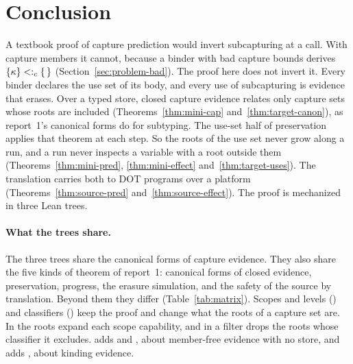 \section{Conclusion}\label{sec:conclusion}
\mathplain
\suppressfloats[t]

A textbook proof of capture prediction would invert subcapturing at a call. With capture members it cannot, because a binder with bad capture bounds derives $\{\kappa\} <:_{c} \{\,\}$ (Section~\ref{sec:problem-bad}). The proof here does not invert it. Every binder declares the use set of its body, and every use of subcapturing is evidence that erases. Over a typed store, closed capture evidence relates only capture sets whose roots are included (Theorems~\ref{thm:mini-cap} and~\ref{thm:target-canon}), as report~1's canonical forms do for subtyping. The use-set half of preservation applies that theorem at each step. So the roots of the use set never grow along a run, and a run never inspects a variable with a root outside them (Theorems~\ref{thm:mini-pred}, \ref{thm:mini-effect} and~\ref{thm:target-uses}). The translation carries both to DOT programs over a platform (Theorems~\ref{thm:source-pred} and~\ref{thm:source-effect}). The proof is mechanized in three Lean trees.

\paragraph{What the trees share.}
The three trees share the canonical forms of capture evidence. They also share the five kinds of theorem of report~1: canonical forms of closed evidence, preservation, progress, the erasure simulation, and the safety of the source by translation. Beyond them they differ (Table~\ref{tab:matrix}). Scopes and levels (\treeCC) and classifiers (\treeCL) keep the proof and change what the roots of a capture set are. In \treeCC the roots expand each scope capability, and in \treeCL a filter drops the roots whose classifier it excludes. \treeCC adds  and , about member-free evidence with no store, and \treeCL adds , about kinding evidence.


